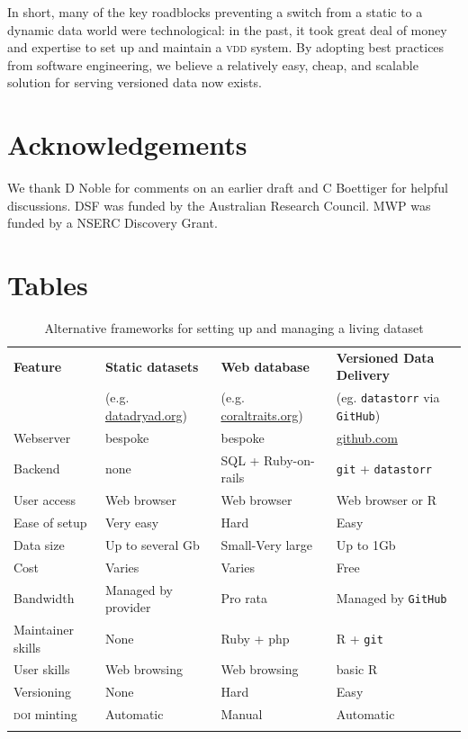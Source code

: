 \documentclass[a4paper,11pt]{article}
\newcommand{\smurl}[1]{{\footnotesize\href{https://#1}{#1}}}
\begin{document}
In short, many of the key roadblocks preventing a switch from a static to a dynamic data world were technological: in the past, it took great deal of money and expertise to set up and maintain a \textsc{vdd} system. By adopting best practices from software engineering, we believe a relatively easy, cheap, and scalable solution for serving versioned data now exists.

\section{Acknowledgements}
We thank D Noble for comments on an earlier draft and C Boettiger for helpful discussions. DSF was funded by the Australian Research Council. MWP was funded by a NSERC Discovery Grant.

\newpage

\section{Tables}

\begin{table}[h!]
\centering
\caption{Alternative frameworks for setting up and managing a living dataset}
{\footnotesize
\vspace{1cm}
  \begin{tabular}{p{2.5cm}p{3.5cm}p{3.5cm}p{4cm}}
  \hline
  \textbf{Feature} & \textbf{Static datasets}& \textbf{Web database} & \textbf{Versioned Data Delivery}\\
  \textbf{} & (e.g. \smurl{datadryad.org})& (e.g. \smurl{coraltraits.org}) & (eg. \texttt{datastorr} via \texttt{GitHub})\\
  \hline
   Webserver        & bespoke & bespoke &  \smurl{github.com}\\
   Backend          & none & SQL + Ruby-on-rails 			& \texttt{git} + \texttt{datastorr} \\
   User access      & Web browser & Web browser 				    & Web browser or R \\
   Ease of setup    & Very easy & Hard 							& Easy\\
   Data size        & Up to several Gb & Small-Very large 				& Up to 1Gb\\
   Cost             & Varies & Varies  						& Free \\
   Bandwidth        & Managed by provider & Pro rata 						& Managed by \texttt{GitHub}\\
   Maintainer skills & None & Ruby + php 					& R + \texttt{git} \\
   User skills      &Web browsing& Web browsing  					& basic R \\
   Versioning       &None& Hard 							& Easy \\
   \textsc{doi} minting      &Automatic & Manual 					& Automatic \\
  \hline 
  \\
 
  \end{tabular}
  } 
\label{tab:publishing_models}
\end{table}
\end{document}
